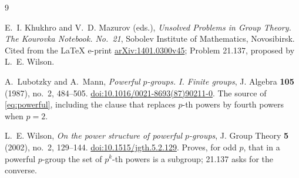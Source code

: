 \documentclass[11pt]{amsart}
\theoremstyle{remark}
\begin{document}
\begin{thebibliography}{9}

E.~I. Khukhro and V.~D. Mazurov (eds.),
\emph{Unsolved Problems in Group Theory. The Kourovka Notebook. No.~21},
Sobolev Institute of Mathematics, Novosibirsk.
Cited from the \LaTeX{} e-print
\href{https://arxiv.org/abs/1401.0300v45}{arXiv:1401.0300v45}; Problem 21.137, proposed by
L.~E. Wilson.

A.~Lubotzky and A.~Mann,
\emph{Powerful $p$-groups. I. Finite groups},
J. Algebra \textbf{105} (1987), no.~2, 484--505.
\href{https://doi.org/10.1016/0021-8693(87)90211-0}{doi:10.1016/0021-8693(87)90211-0}.
The source of \eqref{eq:powerful}, including the clause that replaces $p$-th powers by
fourth powers when $p=2$.

L.~E. Wilson,
\emph{On the power structure of powerful $p$-groups},
J. Group Theory \textbf{5} (2002), no.~2, 129--144.
\href{https://doi.org/10.1515/jgth.5.2.129}{doi:10.1515/jgth.5.2.129}.
Proves, for odd $p$, that in a powerful $p$-group the set of $p^k$-th powers is a subgroup;
21.137 asks for the converse.

\end{thebibliography}
\end{document}
